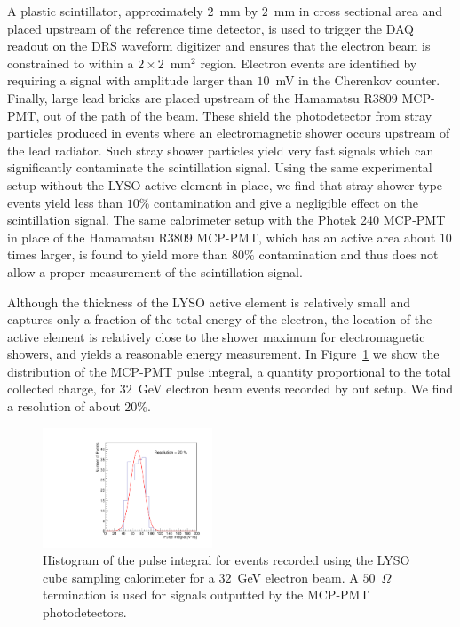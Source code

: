 \documentclass[12pt]{article}
\begin{document}
A plastic scintillator, approximately $2$~mm by $2$~mm in cross sectional area
and placed upstream of the reference time detector, is used to trigger the DAQ
readout on the DRS waveform digitizer and ensures that the electron beam is
constrained to within a $2\times 2$~mm$^2$ region. Electron events are identified by
requiring a signal with amplitude larger than $10$~mV in the Cherenkov counter.
Finally, large lead bricks are placed upstream of the Hamamatsu R3809 MCP-PMT,
out of the path of the beam. These shield the photodetector from stray particles
produced in events where an electromagnetic shower occurs upstream of the lead
radiator. Such stray shower particles yield very fast signals which can
significantly contaminate the scintillation signal. Using the same experimental
setup without the LYSO active element in place, we find that stray shower type
events yield less than $10\%$ contamination and give a negligible effect on the
scintillation signal. The same calorimeter setup with the Photek 240 MCP-PMT in
place of the Hamamatsu R3809 MCP-PMT, which has an active area about $10$ times
larger, is found to yield more than $80\%$ contamination and thus does not allow
a proper measurement of the scintillation signal.

Although the thickness of the LYSO active element is relatively small and
captures only a fraction of the total energy of the electron, the location of
the active element is relatively close to the shower maximum for electromagnetic
showers, and yields a reasonable energy measurement. In
Figure~\ref{fig:LYSOCubeEnergy32GeV} we show the distribution of the MCP-PMT
pulse integral, a quantity proportional to the total collected charge, for
$32$~GeV electron beam events recorded by out setup. We find a resolution of
about $20\%$.


\begin{figure}[h] \centering
\includegraphics[width=0.45\textwidth]{figs/TOF_Electron_LYSOCube_32GeV_energy} 
\caption{ Histogram of the pulse integral for events recorded using
the LYSO cube sampling calorimeter for a $32$~GeV electron beam. A
$50$~$\Omega$ termination is used for signals outputted by the MCP-PMT
photodetectors. } 
\label{fig:LYSOCubeEnergy32GeV}
\end{figure}
\end{document}
